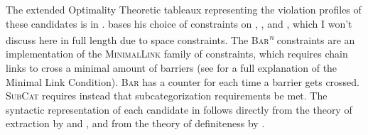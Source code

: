 The extended Optimality Theoretic tableaux representing the violation profiles of these candidates is in . \textcite{keller1997extraction} bases his choice of constraints on \textcite{diesing1992indefinites}, \textcite{legendre1995optimality}, and \textcite{legendre1998less}, which I won't discuss here in full length due to space constraints. The \textsc{Bar}\textsuperscript{\textit{n}} constraints are an implementation of the \textsc{MinimalLink} family of constraints, which requires chain links to cross a minimal amount of barriers (see \textcite{chomsky1993minimalist} for a full explanation of the Minimal Link Condition). \textsc{Bar} has a counter for each time a barrier gets crossed. \textsc{SubCat} requires instead that subcategorization requirements be met. The syntactic representation of each candidate in  follows directly from the theory of extraction by \textcite{legendre1995optimality} and \textcite{legendre1998less}, and from the theory of definiteness by \textcite{diesing1992indefinites}.

